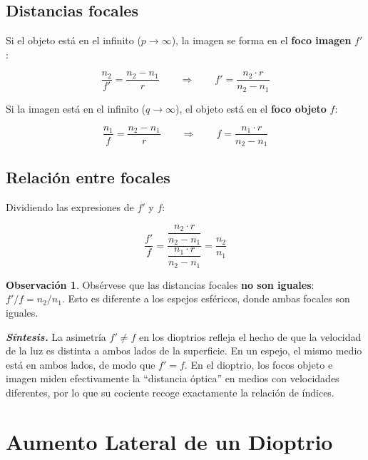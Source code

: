 \documentclass[12pt, a4paper]{article}
\theoremstyle{definition}
\newtheorem{observacion}{Observación}[section]
\begin{document}
\subsection{Distancias focales}

Si el objeto está en el infinito (\(p \to \infty\)), la imagen se forma en el
\textbf{foco imagen} \(f'\):

\begin{equation}
  \frac{n_2}{f'} = \frac{n_2 - n_1}{r} \qquad\Longrightarrow\qquad
  f' = \frac{n_2 \cdot r}{n_2 - n_1}
  \label{eq:foco_imagen}
\end{equation}

Si la imagen está en el infinito (\(q \to \infty\)), el objeto está en el
\textbf{foco objeto} \(f\):

\begin{equation}
  \frac{n_1}{f} = \frac{n_2 - n_1}{r} \qquad\Longrightarrow\qquad
  f = \frac{n_1 \cdot r}{n_2 - n_1}
  \label{eq:foco_objeto}
\end{equation}

\subsection{Relación entre focales}

Dividiendo las expresiones de \(f'\) y \(f\):

\begin{equation}
  \frac{f'}{f} = \frac{\dfrac{n_2 \cdot r}{n_2 - n_1}}{\dfrac{n_1 \cdot r}{n_2 - n_1}}
  = \frac{n_2}{n_1}
  \label{eq:relacion_focales}
\end{equation}

\begin{observacion}
Obsérvese que las distancias focales \textbf{no son iguales}: \(f'/f = n_2/n_1\). Esto es
diferente a los espejos esféricos, donde ambas focales son iguales.
\end{observacion}

\textit{\textbf{Síntesis.}} La asimetría \(f' \neq f\) en los dioptrios refleja el hecho
de que la velocidad de la luz es distinta a ambos lados de la superficie. En un espejo, el
mismo medio está en ambos lados, de modo que \(f' = f\). En el dioptrio, los focos objeto
e imagen miden efectivamente la ``distancia óptica'' en medios con velocidades diferentes,
por lo que su cociente recoge exactamente la relación de índices.

\section{Aumento Lateral de un Dioptrio}
\end{document}
